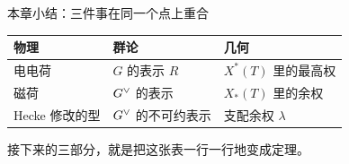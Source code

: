 \begin{frame}{本章小结：三件事在同一个点上重合}
  \begin{center}
  \renewcommand{\arraystretch}{1.3}
  \begin{tabular}{@{}lll@{}}
    \toprule
    物理 & 群论 & 几何 \\
    \midrule
    电电荷 & $G$ 的表示 $R$ & $X^*(T)$ 里的最高权 \\
    磁荷 & $G^{\vee}$ 的表示 & $X_*(T)$ 里的余权 \\
    Hecke 修改的型 & $G^{\vee}$ 的不可约表示 & 支配余权 $\lambda$ \\
    \bottomrule
  \end{tabular}
  \end{center}
  \vspace{0.5em}
  接下来的三部分，就是把这张表一行一行地变成定理。
\end{frame}
